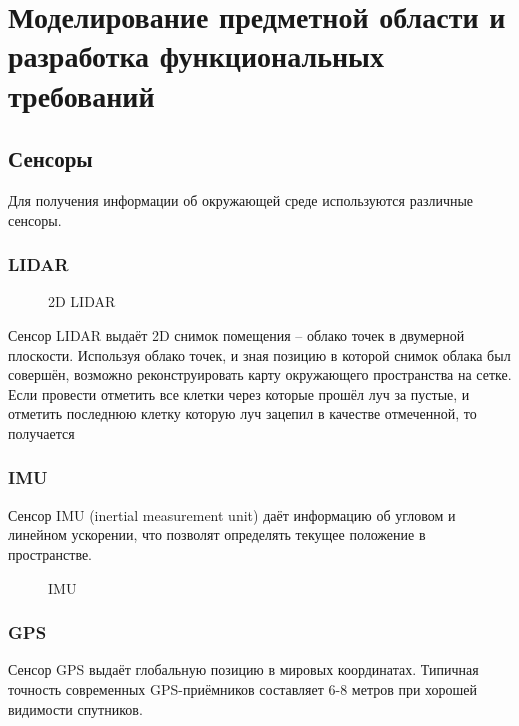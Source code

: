 \section{Моделирование предметной области и разработка функциональных
требований}

{
\renewcommand{\mathbf}[1]{#1}
\subsection{Сенсоры}

Для получения информации об окружающей среде используются различные сенсоры.

\subsubsection{LIDAR}

\begin{figure}[h]
\centering
\caption{2D LIDAR}
\end{figure}

Сенсор LIDAR выдаёт 2D снимок помещения -- облако точек в двумерной плоскости.
Используя облако точек, и зная позицию в которой снимок облака был совершён,
возможно реконструировать карту окружающего пространства на сетке. Если провести
отметить все клетки через которые прошёл луч за пустые, и отметить последнюю
клетку которую луч зацепил в качестве отмеченной, то получается 

\subsubsection{IMU}
Сенсор IMU (inertial measurement unit) даёт информацию об угловом и линейном
ускорении, что позволят определять текущее положение в пространстве.

\begin{figure}[h]
\centering
\caption{IMU}
\end{figure}

\subsubsection{GPS}
Сенсор GPS выдаёт глобальную позицию в мировых координатах. Типичная точность
современных GPS-приёмников составляет 6-8 метров при хорошей видимости
спутников. 


}
